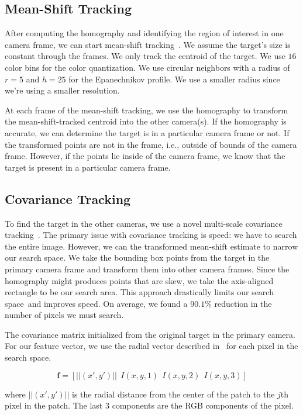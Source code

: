 \documentclass{article}
\begin{document}
\subsection{Mean-Shift Tracking}
\label{sec:meanshift}
After computing the homography and identifying the region of interest in one camera frame, we can start mean-shift tracking~\cite{comaniciu2003kernel}. We assume the target's size is constant through the frames. We only track the centroid of the target. We use $16$ color bins for the color quantization. We use circular neighbors with a radius of $r=5$ and $h=25$ for the Epanechnikov profile. We use a smaller radius since we're using a smaller resolution.

At each frame of the mean-shift tracking, we use the homography to transform the mean-shift-tracked centroid into the other camera(s). If the homography is accurate, we can determine the target is in a particular camera frame or not. If the transformed points are not in the frame, i.e., outside of bounds of the camera frame. However, if the points lie inside of the camera frame, we know that the target is present in a particular camera frame.

\subsection{Covariance Tracking}
\label{sec:covariance}
To find the target in the other cameras, we use a novel multi-scale covariance tracking~\cite{porikli2006covariance}. The primary issue with covariance tracking is speed: we have to search the entire image. However, we can the transformed mean-shift estimate to narrow our search space. We take the bounding box points from the target in the primary camera frame and transform them into other camera frames. Since the homography might produces points that are skew, we take the axis-aligned rectangle to be our search area. This approach drastically limits our search space and improves speed. On average, we found a $90.1\%$ reduction in the number of pixels we must search.

The covariance matrix initialized from the original target in the primary camera. For our feature vector, we use the radial vector described in~\cite{porikli2006covariance} for each pixel in the search space.

\[
\mathbf{f} = \left[ ||(x', y')||~~I(x,y,1)~~I(x,y,2)~~I(x,y,3)\right]
\]

where $||(x', y')||$ is the radial distance from the center of the patch to the $j$th pixel in the patch. The last $3$ components are the RGB components of the pixel.
\end{document}
